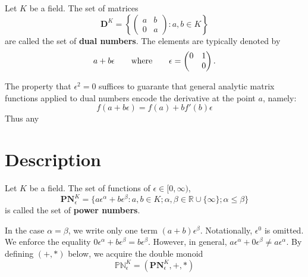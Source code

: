 \documentclass[acmsmall]{acmart}
\begin{document}
\begin{definition}
Let $K$ be a field. The set of matrices
$$\mathbf{D}^K = \left\{\begin{pmatrix}a & b \\ 0 & a \end{pmatrix} : a,b \in K\right\}$$ 
are called the set of \textbf{dual numbers}. The elements are typically denoted by
$$
a + b \epsilon \qquad \hbox{where} \qquad \epsilon = \begin{pmatrix} 0 & 1 \\ & 0 \end{pmatrix}.
$$
\end{definition}

The property that $\epsilon^2 = 0 $ suffices to guarante that general analytic matrix functions applied to dual numbers encode the derivative at the point $a$, namely:
$$
f(a + b \epsilon) = f(a) + b f'(b) \epsilon
$$
Thus any 

%
%

\section{Description}
\begin{definition}
Let $K$ be a field. The set of functions of $\epsilon \in [0,\infty)$,
$$\mathbf{PN}^K_\epsilon = \{a\epsilon^\alpha + b\epsilon^\beta : a,b \in K;\alpha,\beta\in\mathbb{R}\cup\{\infty\}; \alpha\leq\beta\}$$ 
is called the set of \textbf{power numbers}. 
\end{definition}
In the case $\alpha=\beta$, we write only one term $(a+b)\epsilon^\beta$. Notationally, $\epsilon^0$ is omitted.
We enforce the equality $0\epsilon^\alpha + b\epsilon^\beta = b\epsilon^\beta$. However, in general, $a\epsilon^\alpha + 0\epsilon^\beta \neq a\epsilon^\alpha$.
By defining $(+,*)$ below, we acquire the double monoid $$\mathbb{PN}^K_\epsilon = (\mathbf{PN}^K_\epsilon,+,*)$$
\end{document}
